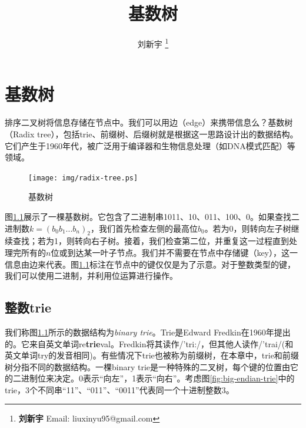\documentclass[b5paper]{ctexart}
\begin{document}
\title{基数树}

\author{刘新宇
\thanks{{\bfseries 刘新宇 } \newline
  Email: liuxinyu95@gmail.com \newline}
  }

\maketitle
\fi


\ifx\wholebook\relax
\chapter{基数树}
\fi

\label{introduction} 

排序二叉树将信息存储在节点中。我们可以用边（edge）来携带信息么？基数树（Radix tree），包括trie、前缀树、后缀树就是根据这一思路设计出的数据结构。它们产生于1960年代，被广泛用于编译器\cite{okasaki-int-map}和生物信息处理（如DNA模式匹配）\cite{wiki-suffix-tree}等领域。

\begin{figure}[htbp]
  \centering
  \texttt{[image: img/radix-tree.ps]}
  \caption{基数树}
  \label{fig:radix-tree}
\end{figure}

图\ref{fig:radix-tree}展示了一棵基数树。它包含了二进制串1011、10、011、100、0。如果查找二进制数$k=(b_0b_1...b_n)_2$，我们首先检查左侧的最高位$b_0$。若为0，则转向左子树继续查找；若为1，则转向右子树。接着，我们检查第二位，并重复这一过程直到处理完所有的$n$位或到达某一叶子节点。我们并不需要在节点中存储键（key），这一信息由边来代表。图\ref{fig:radix-tree}标注在节点中的键仅仅是为了示意。对于整数类型的键，我们可以使用二进制，并利用位运算进行操作。

\section{整数trie}
\label{int-trie} 

我们称图\ref{fig:radix-tree}所示的数据结构为\emph{binary trie}。Trie是Edward Fredkin在1960年提出的。它来自英文单词re\textbf{trie}val。Fredkin将其读作/'tri:/，但其他人读作/'trai/(和英文单词try的发音相同)\cite{wiki-trie}。有些情况下trie也被称为前缀树，在本章中，trie和前缀树分指不同的数据结构。一棵binary trie是一种特殊的二叉树，每个键的位置由它的二进制位来决定。0表示“向左”，1表示“向右”\cite{okasaki-int-map}。考虑图\ref{fig:big-endian-trie}中的trie，3个不同串``11''、``011''、``0011''代表同一个十进制整数3。
\end{document}
